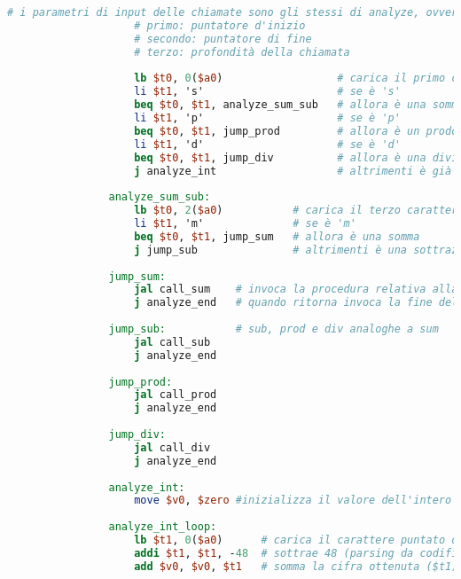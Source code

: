 \begin{center}
\begin{lstlisting}[language=mips, gobble=14, stepnumber=1]
                    # i parametri di input delle chiamate sono gli stessi di analyze, ovvero:
                    # primo: puntatore d'inizio
                    # secondo: puntatore di fine
                    # terzo: profondità della chiamata
                    
                    lb $t0, 0($a0)                  # carica il primo carattere della stringa
                    li $t1, 's'                     # se è 's'
                    beq $t0, $t1, analyze_sum_sub   # allora è una somma o una sottrazione
                    li $t1, 'p'                     # se è 'p'
                    beq $t0, $t1, jump_prod         # allora è un prodotto
                    li $t1, 'd'                     # se è 'd'
                    beq $t0, $t1, jump_div          # allora è una divisione
                    j analyze_int                   # altrimenti è già un intero
                    
                analyze_sum_sub:
                    lb $t0, 2($a0)           # carica il terzo carattere della stringa
                    li $t1, 'm'              # se è 'm'
                    beq $t0, $t1, jump_sum   # allora è una somma
                    j jump_sub               # altrimenti è una sottrazione
                    
                jump_sum:
                    jal call_sum    # invoca la procedura relativa alla somma
                    j analyze_end   # quando ritorna invoca la fine dell'analisi (comune a tutte le operazioni)
                    
                jump_sub:           # sub, prod e div analoghe a sum
                    jal call_sub
                    j analyze_end
                    
                jump_prod:
                    jal call_prod
                    j analyze_end
                    
                jump_div:
                    jal call_div
                    j analyze_end
                    
                analyze_int:
                    move $v0, $zero #inizializza il valore dell'intero a 0
                    
                analyze_int_loop:
                    lb $t1, 0($a0)      # carica il carattere puntato da $a0
                    addi $t1, $t1, -48  # sottrae 48 (parsing da codifica ASCII a intero)
                    add $v0, $v0, $t1   # somma la cifra ottenuta ($t1) col valore fin'ora calcolato ($v0)
                    

\end{lstlisting}
\end{center}

